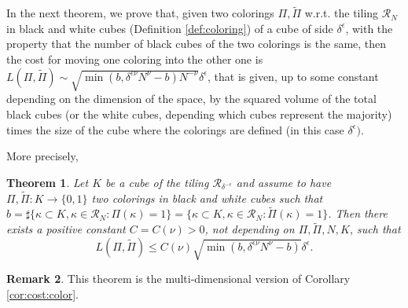 \documentclass[12 pt]{article}
\theoremstyle{definition} \newtheorem{definition}{Definition}[section]
\theoremstyle{definition} \newtheorem{remark}[definition]{Remark}
\theoremstyle{plain} \newtheorem{lemma}[definition]{Lemma}
\theoremstyle{plain} \newtheorem{proposition}[definition]{Proposition}
\theoremstyle{plain} \newtheorem{theorem}[definition]{Theorem}
\theoremstyle{plain} \newtheorem{corollary}[definition]{Corollary}
\theoremstyle{definition} \newtheorem{example}[definition]{Example}
\theoremstyle{definition} \newtheorem{assumption}[definition]{Assumption}
\theoremstyle{definition} \newtheorem{conjecture}[definition]{Conjecture}
\newcommand{\1}{\mathbbm 1}
\numberwithin{equation}{section}
\begin{document}
 In the next theorem, we prove that, given two colorings $\Pi,\tilde\Pi$ w.r.t. the tiling $\mathcal{R}_N$  in black and white cubes (Definition \ref{def:coloring}) of a cube of side $\delta^\epsilon$, with the property that the number of black cubes of the two colorings is the same, then the cost for moving one coloring into the other one is $L(\Pi,\tilde \Pi)\sim \sqrt{\min({b, \delta^{\epsilon\nu}N^\nu}-b)N^{-\nu}}\delta^\epsilon$, that is given, up to some constant depending on the dimension of the space, by the squared volume of the total black cubes (or the white cubes, depending which cubes represent the majority) times the size of the cube where the colorings are defined (in this case $\delta^\epsilon)$.
 
 \medskip
 
 More precisely,

\begin{theorem}\label{thm:cost:nucube}
   Let $K$ be a cube of the tiling $\mathcal{R}_{\delta^{-\epsilon}}$ and assume to have $\Pi,\tilde \Pi: K\rightarrow\lbrace 0,1\rbrace$ two colorings in black and white cubes such that $b=\sharp\lbrace \kappa\subset K,\kappa\in\mathcal{R}_N:\Pi(\kappa)=1\rbrace=\lbrace \kappa\subset K,\kappa\in\mathcal{R}_N:\tilde\Pi(\kappa)=1\rbrace$. Then there exists a positive constant $C=C(\nu)>0$, not depending on $\Pi,\tilde \Pi, N, K$, such that
   \begin{equation*}
       L(\Pi,\tilde \Pi)\leq C(\nu)\sqrt{\min({b, \delta^{\epsilon\nu}N^\nu}-b)}\delta^\epsilon.
   \end{equation*}
\end{theorem}
\begin{remark}
    This theorem is the multi-dimensional version of Corollary \ref{cor:cost:color}.
\end{remark}
\end{document}
